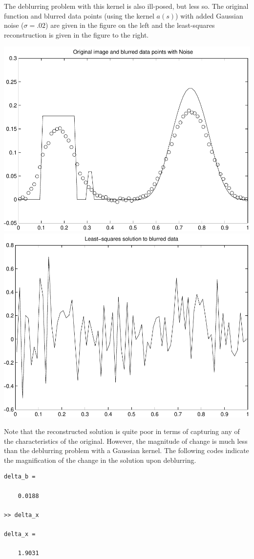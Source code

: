 \documentclass{homework}
\begin{document}
\begin{longproblem}
\begin{solution}
  The deblurring problem with this kernel is also ill-posed, but less so.  The original function and blurred data points (using the kernel $a(s)$) with added Gaussian noise ($\sigma = .02$) are given in the figure on the left and the least-squares reconstruction is given in the figure to the right. 
  \begin{center}
  \includegraphics[width=.4\textwidth]{data.pdf}
  \includegraphics[width=.4\textwidth]{reconstruction.pdf}
  \end{center}
  Note that the reconstructed solution is quite poor in terms of capturing any of the characteristics of the original.  However, the magnitude of change is much less than the deblurring problem with a Gaussian kernel. The following codes indicate the magnification of the change in the solution upon deblurring.
  \begin{lstlisting}
delta_b =

    0.0188

>> delta_x 

delta_x =

    1.9031
  \end{lstlisting}

  \end{solution}
\end{longproblem}
\end{document}
